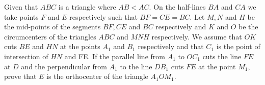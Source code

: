 Given that $ABC$ is a triangle where $AB < AC$. On the half-lines $BA$ and $CA$ we take points $F$ and $E$ respectively such that $BF = CE = BC$. Let $M,N$ and $H$ be the mid-points of the segments $BF,CE$ and $BC$ respectively and $K$ and $O$ be the circumcenters of the triangles $ABC$ and $MNH$ respectively. We assume that $OK$ cuts $BE$ and $HN$ at the points $A_1$ and $B_1$ respectively and that $C_1$ is the point of intersection of $HN$ and FE. If the parallel line from $A_1$ to $OC_1$ cuts the line $FE$ at $D$ and the perpendicular from $A_1$ to the line $DB_1$ cuts $FE$ at the point $M_1$,  prove that $E$ is the orthocenter of the triangle $A_1OM_1$.